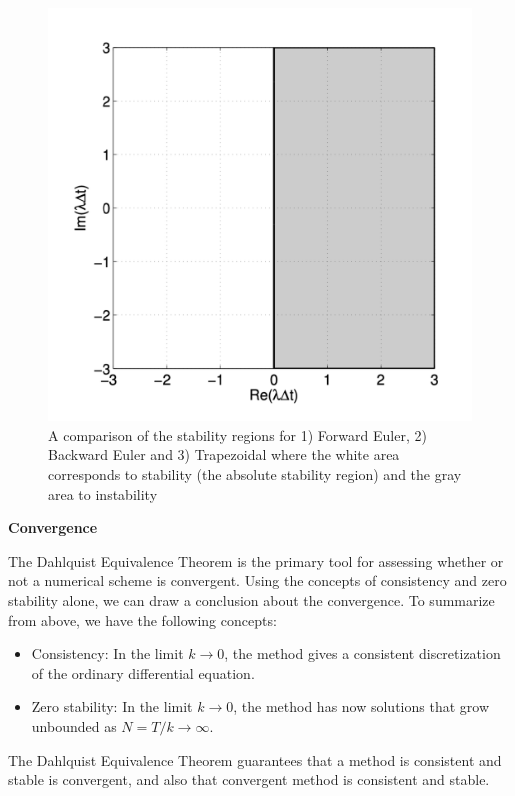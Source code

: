 \begin{figure}[h]
\begin{minipage}[b]{0.3\linewidth}
  \end{minipage}
  \hspace{0.01\linewidth}
  \begin{minipage}[b]{0.3\linewidth}
    \centering
    \includegraphics[width=\linewidth]{figures/trap_stability.png}
  \end{minipage}
  \caption{A comparison of the stability regions for 1) Forward Euler, 2) Backward Euler and 3) Trapezoidal where the white area corresponds to stability (the absolute stability region) and the gray area to instability \cite{num_methods_mit}}
  \label{fig:stability}
\end{figure}


\vspace{0.5cm}
\noindent\textbf{Convergence}

The Dahlquist Equivalence Theorem is the primary tool for assessing whether or not a numerical scheme is convergent. Using the concepts of consistency and zero stability alone, we can draw a conclusion about the convergence. To summarize from above, we have the following concepts:

\begin{itemize}
    \item Consistency: \quad In the limit $k \rightarrow 0$, the method gives a consistent discretization of the ordinary differential equation. 
    \item Zero stability: \quad In the limit $k \rightarrow 0$, the method has now solutions that grow unbounded as $N = T / k \rightarrow \infty$. 
\end{itemize}

The Dahlquist Equivalence Theorem guarantees that a method is consistent and stable is convergent, and also that convergent method is consistent and stable.


